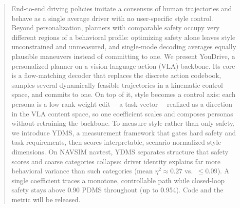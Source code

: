 \begin{abstract}
End-to-end driving policies imitate a consensus of human trajectories and behave
as a single average driver with no user-specific style control. Beyond
personalization, planners with comparable safety occupy very different regions of
a behavioral profile: optimizing safety alone leaves style unconstrained and
unmeasured, and single-mode decoding averages equally plausible maneuvers instead
of committing to one. We present YouDrive, a personalized planner on a
vision-language-action (VLA) backbone. Its core is a flow-matching decoder that
replaces the discrete action codebook, samples several dynamically feasible
trajectories in a kinematic control space, and commits to one. On top of it, style
becomes a control axis: each persona is a low-rank weight edit\,---\,a task
vector\,---\,realized as a direction in the VLA content space, so one coefficient
scales and composes personas without retraining the backbone. To measure style
rather than only safety, we introduce YDMS, a measurement framework that gates
hard safety and task requirements, then scores interpretable, scenario-normalized
style dimensions. On NAVSIM navtest, YDMS separates structure that safety scores
and coarse categories collapse: driver identity explains far more behavioral
variance than such categories (mean $\eta^2 \approx 0.27$ vs.\ $\le 0.09$). A
single coefficient traces a monotone, controllable path while closed-loop safety
stays above 0.90 PDMS throughout (up to 0.954). Code and the metric will be
released.
\end{abstract}
